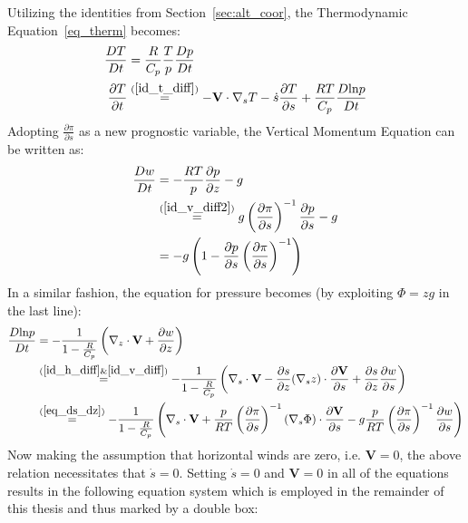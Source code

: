 \noindent
Utilizing the identities from Section~\ref{sec:alt_coor}, the Thermodynamic Equation~\ref{eq_therm} becomes:
\begin{align*}
\frac{DT}{Dt} &= \frac{R}{C_p}\frac{T}{p}\frac{Dp}{Dt}\\
\frac{\partial T}{\partial t} &\stackrel{(\ref{id_t_diff})}{=} -\textbf{V} \cdot \nabla _s T - \dot{s} \frac{\partial T}{\partial s}+\frac{RT}{C_p}\frac{D\text{ln}p}{Dt}
\end{align*}
Adopting $\frac{\partial \pi}{\partial s}$ as a new prognostic variable, the Vertical Momentum Equation can be written as:
\begin{align*}
\frac{Dw}{Dt} &= - \frac{RT}{p} \frac{\partial p}{\partial z} - g\\
&\stackrel{(\ref{id_v_diff2})}{=} g \left(\frac{\partial \pi}{\partial s}\right)^{-1}\frac{\partial p}{\partial s} - g\\
&= -g\left(1 - \frac{\partial p}{\partial s}\left(\frac{\partial \pi}{\partial s}\right)^{-1}\right)
\end{align*}
In a similar fashion, the equation for pressure becomes (by exploiting $\Phi = zg$ in the last line):
\begin{align*}
\frac{D\text{ln}p}{Dt} &= -\frac{1}{1- \frac{R}{C_p}} \left(\nabla_z \cdot \textbf{V} + \frac{\partial w}{\partial z}\right)\\
&\stackrel{(\ref{id_h_diff} \& \ref{id_v_diff})}{=} -\frac{1}{1- \frac{R}{C_p}} \left(\nabla _s \cdot \textbf{V} - \frac{\partial s}{\partial z} (\nabla _sz)\cdot \frac{\partial \textbf{V}}{\partial s} + \frac{\partial s}{\partial z}\frac{\partial w}{\partial s}\right)\\
&\stackrel{(\ref{eq_ds_dz})}{=} -\frac{1}{1- \frac{R}{C_p}} \left(\nabla _s \cdot \textbf{V} + \frac{p}{RT}\left(\frac{\partial \pi}{\partial s}\right)^{-1} (\nabla _s \Phi)\cdot\frac{\partial \textbf{V}}{\partial s} - g\frac{p}{RT}\left(\frac{\partial \pi}{\partial s}\right)^{-1} \frac{\partial w}{\partial s}\right)\\
\end{align*}
Now making the assumption that horizontal winds are zero, i.e. $\textbf{V}=0$, the above relation necessitates that $\dot{s}=0$.
Setting $\dot{s}=0$ and $\textbf{V}=0$ in all of the equations results in the following equation system which is employed in the remainder of this thesis and thus marked by a double box:

